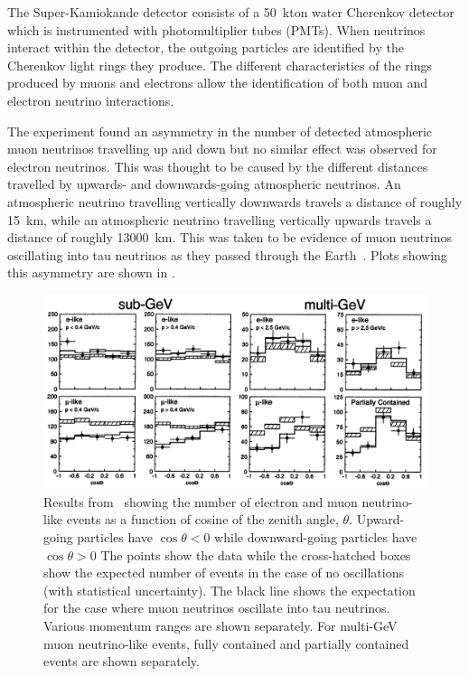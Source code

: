 The Super-Kamiokande detector consists of a 50~kton water Cherenkov detector which is instrumented with photomultiplier tubes (PMTs).
When neutrinos interact within the detector, the outgoing particles are identified by the Cherenkov light rings they produce.
The different characteristics of the rings produced by muons and electrons allow the identification of both muon and electron neutrino interactions.

The experiment found an asymmetry in the number of detected atmospheric muon neutrinos travelling up and down but no similar effect was observed for electron neutrinos.
This was thought to be caused by the different distances travelled by upwards- and downwards-going atmospheric neutrinos.
An atmospheric neutrino travelling vertically downwards travels a distance of roughly 15~km, while an atmospheric neutrino travelling vertically upwards travels a distance of roughly 13000~km.
This was taken to be evidence of muon neutrinos oscillating into tau neutrinos as they passed through the Earth~\cite{superK}.
Plots showing this asymmetry are shown in .

\begin{figure}[h]
  \centering
  \includegraphics[width=\linewidth]{files/figures/theory/superKResults}
  \caption[Super-Kamiokande atmospheric neutrino results as a function of zenith angle.]{Results from~\cite{superK} showing the number of electron and muon neutrino-like events as a function of cosine of the zenith angle, $\theta$. Upward-going particles have $\cos\theta<0$ while downward-going particles have $\cos\theta>0$ The points show the data while the cross-hatched boxes show the expected number of events in the case of no oscillations (with statistical uncertainty). The black line shows the expectation for the case where muon neutrinos oscillate into tau neutrinos. Various momentum ranges are shown separately. For multi-GeV muon neutrino-like events, fully contained and partially contained events are shown separately.}
  \label{fig:superKResults}
\end{figure}


